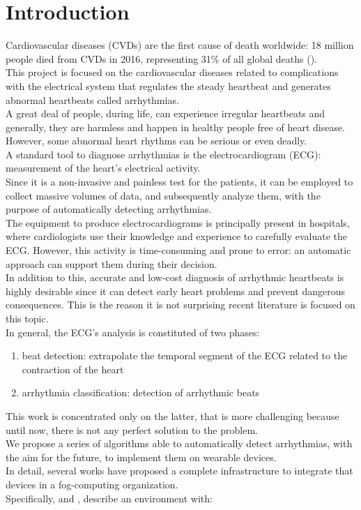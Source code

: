\documentclass[LaM,binding=0.6cm]{sapthesis}
\begin{document}
\chapter{Introduction}
Cardiovascular diseases (CVDs) are the first cause of death worldwide: 18 million people died from CVDs in 2016, representing 31\% of all global deaths (\cite{who}).\\This project is focused on the cardiovascular diseases related to complications with the electrical system that regulates the steady heartbeat and generates abnormal heartbeats called arrhythmias.\\A great deal of people, during life, can experience irregular heartbeats and generally,  they are harmless and happen in healthy people free of heart disease.\\However, some abnormal heart rhythms can be serious or even deadly.\\A standard tool to diagnose arrhythmias is the electrocardiogram (ECG): measurement of the heart's electrical activity.\\Since it is a non-invasive and painless test for the patients, it can be employed to collect massive volumes of data, and subsequently analyze them, with the purpose of automatically detecting arrhythmias.\\The equipment to produce electrocardiograms is principally present in hospitals, where cardiologists use their knowledge and experience to carefully evaluate the ECG. However, this activity is time-consuming and prone to error: an automatic approach can support them during their decision.\\In addition to this, accurate and low-cost diagnosis of arrhythmic heartbeats is highly desirable since it can detect early heart problems and prevent dangerous consequences. This is the reason it is not surprising recent literature is focused on this topic.\\In general, the ECG's analysis is constituted of two phases:
\begin{enumerate}
\item beat detection: extrapolate the temporal segment of the ECG related to the contraction of the heart
\item arrhythmia  classification: detection of arrhythmic beats
\end{enumerate} 
This work is concentrated only on the latter, that is more challenging because until now, there is not any perfect solution to the problem.\\We propose a series of algorithms able to automatically detect arrhythmias, with the aim for the future, to implement them on wearable devices.\\In detail, several works have proposed a complete infrastructure to integrate that devices in a fog-computing organization.\\Specifically, \cite{fog} and \cite{citf}, describe an environment with:
\end{document}

